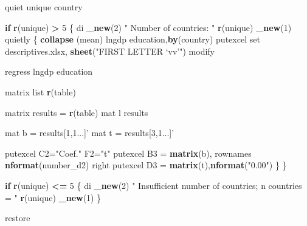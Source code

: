 \documentclass[
  12pt,
]{article}
\newenvironment{Shaded}{\begin{snugshade}}{\end{snugshade}}
\newcommand{\ControlFlowTok}[1]{\textcolor[rgb]{0.13,0.29,0.53}{\textbf{#1}}}
\newcommand{\DecValTok}[1]{\textcolor[rgb]{0.00,0.00,0.81}{#1}}
\newcommand{\KeywordTok}[1]{\textcolor[rgb]{0.13,0.29,0.53}{\textbf{#1}}}
\newcommand{\NormalTok}[1]{#1}
\newcommand{\OperatorTok}[1]{\textcolor[rgb]{0.81,0.36,0.00}{\textbf{#1}}}
\newcommand{\StringTok}[1]{\textcolor[rgb]{0.31,0.60,0.02}{#1}}
\begin{document}
\begin{Shaded}
\begin{Highlighting}[]
\NormalTok{        quiet unique country}
            
            \ControlFlowTok{if} \KeywordTok{r}\NormalTok{(unique) }\OperatorTok{>}\StringTok{ }\DecValTok{5}\NormalTok{ \{}
\NormalTok{            di }\KeywordTok{_new}\NormalTok{(}\DecValTok{2}\NormalTok{) }\StringTok{"    Number of countries:    "} \KeywordTok{r}\NormalTok{(unique) }\KeywordTok{_new}\NormalTok{(}\DecValTok{1}\NormalTok{)}
\NormalTok{            quietly \{}
                \KeywordTok{collapse}\NormalTok{ (mean) lngdp education,}\KeywordTok{by}\NormalTok{(country)}
\NormalTok{                    putexcel set descriptives.xlsx, }\KeywordTok{sheet}\NormalTok{(}\StringTok{"FIRST LETTER `vv'"}\NormalTok{) modify}
                    
\NormalTok{                    regress lngdp education}
                        
\NormalTok{                            matrix list }\KeywordTok{r}\NormalTok{(table)}
                        
\NormalTok{                        matrix results =}\StringTok{ }\KeywordTok{r}\NormalTok{(table)}
\NormalTok{                            mat l results}
                        
\NormalTok{                        mat b =}\StringTok{ }\NormalTok{results[}\DecValTok{1}\NormalTok{,}\DecValTok{1}\NormalTok{...]}\StringTok{'}
\StringTok{                        mat t = results[3,1...]'}
                        
\NormalTok{                        putexcel C2=}\StringTok{"Coef."}\NormalTok{ F2=}\StringTok{"t"}
\NormalTok{                        putexcel B3 =}\StringTok{ }\KeywordTok{matrix}\NormalTok{(b), rownames }\KeywordTok{nformat}\NormalTok{(number_d2) right}
\NormalTok{                        putexcel D3 =}\StringTok{ }\KeywordTok{matrix}\NormalTok{(t),}\KeywordTok{nformat}\NormalTok{(}\StringTok{"0.00"}\NormalTok{)}
\NormalTok{                \}}
\NormalTok{            \}}
            
            \ControlFlowTok{if} \KeywordTok{r}\NormalTok{(unique) }\OperatorTok{<=}\StringTok{ }\DecValTok{5}\NormalTok{ \{}
\NormalTok{                di }\KeywordTok{_new}\NormalTok{(}\DecValTok{2}\NormalTok{) }\StringTok{"    Insufficient number of countries; n countries = "} \KeywordTok{r}\NormalTok{(unique) }\KeywordTok{_new}\NormalTok{(}\DecValTok{1}\NormalTok{)}
\NormalTok{            \}}
            
\NormalTok{        restore}
    

\end{Highlighting}
\end{Shaded}
\end{document}

